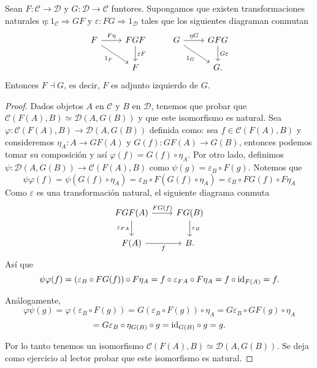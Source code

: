 \documentclass{comunicaciones}
\begin{document}
\begin{prop}\label{idtriang}
	Sean $F:\mathcal{C}\to \mathcal{D}$ y $G:\mathcal{D}\to \mathcal{C}$ funtores. Supongamos que existen transformaciones naturales $\eta: 1_\mathcal{C}\Rightarrow GF$ y $\varepsilon: FG\Rightarrow 1_\mathcal{D}$ tales que los siguientes diagraman conmutan 
	\[
	\begin{tikzcd}
		F \arrow[r, "F\eta"] \arrow[rd, "1_F"'] & FGF \arrow[d, "\varepsilon F"] & G \arrow[r, "\eta G"] \arrow[rd, "1_G"'] & GFG \arrow[d, "G\varepsilon"] \\
		& F & & G.                            
	\end{tikzcd}
	\]
	Entonces $F\dashv G$, es decir, $F$ es adjunto izquierdo de $G$.
\end{prop}

\begin{proof}
	Dados objetos $A$ en $\mathcal{C}$ y $B$ en $\mathcal{D}$, tenemos que probar que $\mathcal{C}(F(A),B)\simeq \mathcal{D}(A,G(B))$ y que este isomorfismo es natural. Sea $\varphi:\mathcal{C}(F(A),B)\to \mathcal{D}(A,G(B))$ definida como: sea $f\in \mathcal{C}(F(A),B)$ y consideremos $\eta_A:A\to GF(A)$ y $G(f):GF(A)\to G(B)$, entonces podemos tomar su composici\'on y as\'i  $\varphi(f)=G(f)\circ \eta_A$. Por otro lado, definimos $\psi:\mathcal{D}(A,G(B))\to \mathcal{C}(F(A),B)$ como $\psi(g)=\varepsilon_{B}\circ F(g)$. Notemos que 
	\[\psi\varphi(f)=\psi(G(f)\circ \eta_A)=\varepsilon_{B}\circ F(G(f)\circ \eta_A)=\varepsilon_{B}\circ FG(f)\circ F\eta_A\]
	Como $\varepsilon$ es una transformaci\'on natural, el siguiente diagrama conmuta
	\[
	\begin{tikzcd}
		FGF(A) \arrow[r, "FG(f)"] \arrow[d, "\varepsilon_{FA}"'] & FG(B) \arrow[d, "\varepsilon_B"]  \\
		F(A) \arrow[r, "f"'] & B.                          
	\end{tikzcd}
	\]
	As\'i que 
	\[\psi\varphi(f)=(\varepsilon_{B}\circ FG(f))\circ F\eta_A=f\circ \varepsilon_{FA}\circ F\eta_A=f\circ \mathrm{id}_{F(A)}=f.\]
	
	An\'alogamente,
	\[\varphi\psi(g)=\varphi(\varepsilon_{B}\circ F(g))=G(\varepsilon_{B}\circ F(g))\circ \eta_A=G\varepsilon_{B}\circ GF(g)\circ \eta_A\]
	\[=G\varepsilon_{B}\circ\eta_{G(B)}\circ g=\mathrm{id}_{G(B)}\circ g=g.\]
	
	Por lo tanto tenemos un isomorfismo $\mathcal{C}(F(A),B)\simeq \mathcal{D}(A,G(B))$. Se deja como ejercicio al lector probar que este isomorfismo es natural.
\end{proof}
\end{document}
